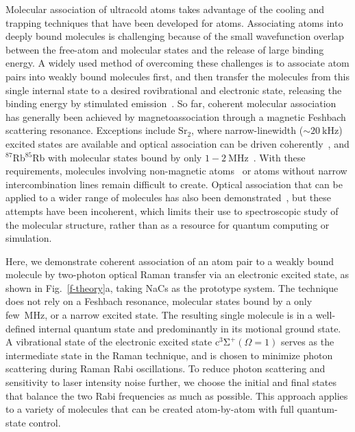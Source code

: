 \documentclass[aps,prx,twocolumn,10pt,superscriptaddress]{revtex4-2}
\begin{document}
Molecular association of ultracold atoms takes advantage of the cooling and trapping techniques
that have been developed for atoms.
Associating atoms into deeply bound molecules is challenging
because of the small wavefunction overlap between the free-atom and molecular states
and the release of large binding energy.
A widely used method of overcoming these challenges is to associate atom pairs
into weakly bound molecules first,
and then transfer the molecules from this single internal state
to a desired rovibrational and electronic state,
releasing the binding energy by stimulated emission~\cite{Danzl2008, Ni2008, Lang2008,
  Takekoshi2014, Molony2014, Park2015, Guo2016, Kondov2019, Voges2020}.
So far, coherent molecular association has generally been achieved by magnetoassociation
through a magnetic Feshbach scattering resonance.
Exceptions include Sr$_2$, where narrow-linewidth ($\sim 20~\mathrm{kHz}$) excited states
are available and optical association can be driven coherently~\cite{Stellmer2012,Reinaudi2012},
and $^{87}$Rb$^{85}$Rb with molecular states bound by only $1-2~\mathrm{MHz}$~\cite{He331}.
With these requirements, molecules involving non-magnetic atoms~\cite{PhysRevX.10.031037}
or atoms without narrow intercombination lines remain difficult to create.
Optical association that can be applied to a wider range of molecules
has also been demonstrated~\cite{Wynar2000,Rom2004,Liu2019}, but these attempts have been incoherent,
which limits their use to spectroscopic study of the molecular structure, 
rather than as a resource for quantum computing or simulation. 

Here, we demonstrate coherent association of an atom pair to a weakly bound molecule
by two-photon optical Raman transfer via an electronic excited state,
as shown in Fig.~\ref{f-theory}a, taking NaCs as the prototype system.
The technique does not rely on a Feshbach resonance,
molecular states bound by a only few~MHz, or a narrow excited state.
The resulting single molecule is in a well-defined internal quantum state
and predominantly in its motional ground state.
A vibrational state of the electronic excited state $\mathrm{c^3\Sigma^+}(\Omega = 1)$
serves as the intermediate state in the Raman technique,
and is chosen to minimize photon scattering during Raman Rabi oscillations.
To reduce photon scattering and sensitivity to laser intensity noise further,
we choose the initial and final states that balance the two Rabi frequencies as much as possible.
This approach applies to a variety of molecules that can be created atom-by-atom
with full quantum-state control.
\end{document}
